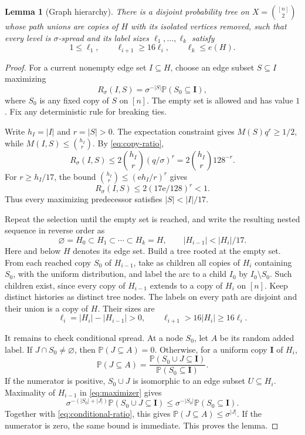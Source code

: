 \documentclass[11pt]{article}
\newtheorem{lemma}[theorem]{Lemma}
\numberwithin{equation}{section}
\newcommand{\PP}{\mathbb P}
\newcommand{\ee}{\mathrm e}
\begin{document}
\begin{lemma}[Graph hierarchy]\label{lem:hierarchy}
There is a disjoint probability tree on
$X=\binom{[n]}2$ whose path unions are copies of $H$ with its isolated
vertices removed, such that every level is $\sigma$-spread and its label
sizes $\ell_1,\ldots,\ell_k$ satisfy
\[
 1\le\ell_1,\qquad \ell_{i+1}\ge16\ell_i,
 \qquad \ell_k\le e(H).
\]
\end{lemma}

\begin{proof}
For a current nonempty edge set $I\subseteq H$, choose an edge
subset $S\subseteq I$ maximizing
\begin{equation}\label{eq:maximizer}
 R_\sigma(I,S)=\sigma^{-|S|}\PP(S_0\subseteq\boldsymbol I),
\end{equation}
where $S_0$ is any fixed copy of $S$ on $[n]$. The empty set is
allowed and has value $1$. Fix any deterministic rule for breaking
ties.

Write $h_I=|I|$ and $r=|S|>0$. The expectation constraint gives
$M(S)q^r\ge1/2$, while $M(I,S)\le\binom{h_I}{r}$.
By \eqref{eq:copy-ratio},
\[
 R_\sigma(I,S)\le2\binom{h_I}{r}(q/\sigma)^r
           =2\binom{h_I}{r}128^{-r}.
\]
For $r\ge h_I/17$, the bound
$\binom{h_I}{r}\le(\ee h_I/r)^r$ gives
\[
 R_\sigma(I,S)\le2(17\ee/128)^r<1.
\]
Thus every maximizing predecessor satisfies $|S|<|I|/17$.

Repeat the selection until the empty set is reached, and write
the resulting nested sequence in reverse order as
\[
 \varnothing=H_0\subset H_1\subset\cdots\subset H_k=H,
 \qquad |H_{i-1}|<|H_i|/17.
\]
Here and below $H$ denotes its edge set. Build a tree rooted at the
empty set. From each reached copy $S_0$ of $H_{i-1}$, take as
children all copies of $H_i$ containing $S_0$, with the uniform
distribution, and label the arc to a child $I_0$ by $I_0\setminus S_0$.
Such children exist, since every copy of $H_{i-1}$ extends to a copy
of $H_i$ on $[n]$. Keep distinct histories as distinct tree nodes.
The labels on every path are disjoint and their union is a copy of
$H$. Their sizes are
\[
 \ell_i=|H_i|-|H_{i-1}|>0,
 \qquad
 \ell_{i+1}>16|H_i|\ge16\ell_i.
\]

It remains to check conditional spread. At a node $S_0$, let $A$
be its random added label. If $J\cap S_0\ne\varnothing$, then
$\PP(J\subseteq A)=0$. Otherwise, for a uniform copy
$\boldsymbol I$ of $H_i$,
\begin{equation}\label{eq:conditional-ratio}
 \PP(J\subseteq A)=
 \frac{\PP(S_0\cup J\subseteq\boldsymbol I)}
      {\PP(S_0\subseteq\boldsymbol I)}.
\end{equation}
If the numerator is positive, $S_0\cup J$ is isomorphic to an edge
subset $U\subseteq H_i$. Maximality of $H_{i-1}$ in
\eqref{eq:maximizer} gives
\[
 \sigma^{-(|S_0|+|J|)}\PP(S_0\cup J\subseteq\boldsymbol I)
 \le \sigma^{-|S_0|}\PP(S_0\subseteq\boldsymbol I).
\]
Together with \eqref{eq:conditional-ratio}, this gives
$\PP(J\subseteq A)\le\sigma^{|J|}$. If the numerator is zero, the same
bound is immediate. This proves the lemma.
\end{proof}
\end{document}
